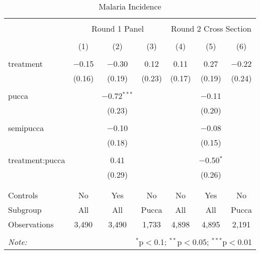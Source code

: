
\begin{table}[!htbp] \centering 
  \caption{Malaria Incidence} 
  \label{tbl:Malaria Incidence} 
\begin{tabular}{@{\extracolsep{5pt}}lcccccc} 
\\[-1.8ex]\hline 
\hline \\[-1.8ex] 
 & \multicolumn{3}{c}{Round 1 Panel} & \multicolumn{3}{c}{Round 2 Cross Section} \\ 
\\[-1.8ex] & (1) & (2) & (3) & (4) & (5) & (6)\\ 
\hline \\[-1.8ex] 
 treatment & $-$0.15 & $-$0.30 & 0.12 & 0.11 & 0.27 & $-$0.22 \\ 
  & (0.16) & (0.19) & (0.23) & (0.17) & (0.19) & (0.24) \\ 
  & & & & & & \\ 
 pucca &  & $-$0.72$^{***}$ &  &  & $-$0.11 &  \\ 
  &  & (0.23) &  &  & (0.20) &  \\ 
  & & & & & & \\ 
 semipucca &  & $-$0.10 &  &  & $-$0.08 &  \\ 
  &  & (0.18) &  &  & (0.15) &  \\ 
  & & & & & & \\ 
 treatment:pucca &  & 0.41 &  &  & $-$0.50$^{*}$ &  \\ 
  &  & (0.29) &  &  & (0.26) &  \\ 
  & & & & & & \\ 
\hline \\[-1.8ex] 
Controls & No & Yes & No & No & Yes & No \\ 
Subgroup & All & All & Pucca & All & All & Pucca \\ 
Observations & 3,490 & 3,490 & 1,733 & 4,898 & 4,895 & 2,191 \\ 
\hline 
\hline \\[-1.8ex] 
\textit{Note:}  & \multicolumn{6}{r}{$^{*}$p$<$0.1; $^{**}$p$<$0.05; $^{***}$p$<$0.01} \\ 
\end{tabular} 
\end{table} 
